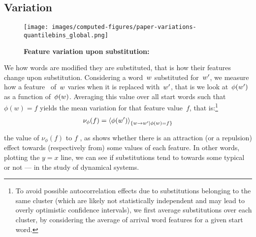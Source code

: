 \subsection{Variation}

\begin{figure*}[!th]
    \centering
    \texttt{[image: images/computed-figures/paper-variations-quantilebins\_global.png]}
    \caption{\textbf{Feature variation upon substitution:} %
    }
    \label{fig:feature-variations-global}
\end{figure*}

We  how words are modified  they are substituted, that is how their features change upon substitution.
Considering a word~$w$ substituted for~$w'$, we measure how a feature~\newtext{$\phi$} of~$w$ varies when it is replaced with~$w'$, that is we look at~$\phi(w')$ as a function of~$\phi(w)$.
Averaging this value over all start words such that $\phi(w) = f$ yields the mean variation for that feature value~$f$, that is:\footnote{To avoid possible autocorrelation effects due to substitutions belonging to the same cluster (which are likely not statistically independent and may lead to overly optimistic confidence intervals), we first average substitutions over each cluster, by considering the average of arrival word features for a given start word. }
$$\nu_{\phi}(f) = \left<\phi(w')\right>_{\left\lbrace w\rightarrow w' | \phi(w) = f \right\rbrace}$$

 the value of $\nu_{\phi}(f)$ to $f$ , as  shows whether there is an attraction (or a repulsion) effect towards (respectively from) some values of each feature.
In other words, plotting the $y=x$ line, we can see if substitutions tend to  towards some typical  or not ---  in the study of dynamical systems.

